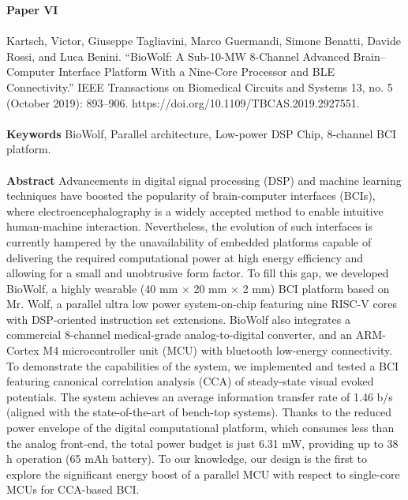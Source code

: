 
\textbf{Paper VI} 
\\ \\
\noindent
Kartsch, Victor, Giuseppe Tagliavini, Marco Guermandi, Simone Benatti, Davide Rossi, and Luca Benini. “BioWolf: A Sub-10-MW 8-Channel Advanced Brain–Computer Interface Platform With a Nine-Core Processor and BLE Connectivity.” IEEE Transactions on Biomedical Circuits and Systems 13, no. 5 (October 2019): 893–906. https://doi.org/10.1109/TBCAS.2019.2927551. \\ \\

\noindent
\textbf{Keywords} BioWolf, Parallel architecture, Low-power DSP Chip, 8-channel BCI platform. \\ \\

\noindent
\textbf{Abstract} Advancements in digital signal processing (DSP) and machine learning techniques have boosted the popularity of brain-computer interfaces (BCIs), where electroencephalography is a widely accepted method to enable intuitive human-machine interaction. Nevertheless, the evolution of such interfaces is currently hampered by the unavailability of embedded platforms capable of delivering the required computational power at high energy efficiency and allowing for a small and unobtrusive form factor. To fill this gap, we developed BioWolf, a highly wearable (40 mm × 20 mm × 2 mm) BCI platform based on Mr. Wolf, a parallel ultra low power system-on-chip featuring nine RISC-V cores with DSP-oriented instruction set extensions. BioWolf also integrates a commercial 8-channel medical-grade analog-to-digital converter, and an ARM-Cortex M4 microcontroller unit (MCU) with bluetooth low-energy connectivity. To demonstrate the capabilities of the system, we implemented and tested a BCI featuring canonical correlation analysis (CCA) of steady-state visual evoked potentials. The system achieves an average information transfer rate of 1.46 b/s (aligned with the state-of-the-art of bench-top systems). Thanks to the reduced power envelope of the digital computational platform, which consumes less than the analog front-end, the total power budget is just 6.31 mW, providing up to 38 h operation (65 mAh battery). To our knowledge, our design is the first to explore the significant energy boost of a parallel MCU with respect to single-core MCUs for CCA-based BCI. \\ \\

